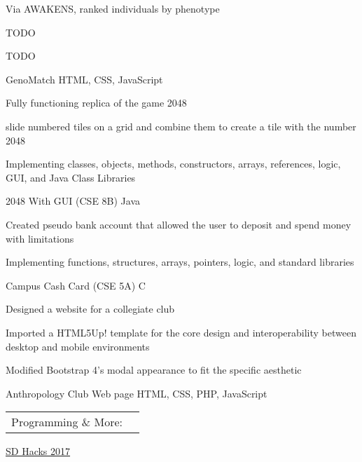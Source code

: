 \documentclass[]{awesome-cv}
\begin{document}
\begin{cventries}
	\cventry
	{\begin{cvitems}
	    \item Via AWAKENS, ranked individuals by phenotype
        \item TODO
        \item TODO
    \end{cvitems}}
	{GenoMatch}
	{HTML, CSS, JavaScript}
	{}
	{}
	
	\vspace{-5mm}
	\cventry
	{\begin{cvitems}
        \item Fully functioning replica of the game 2048
        \item slide numbered tiles on a grid and combine them to create a tile with the number 2048
        \item Implementing classes, objects, methods, constructors, arrays, references, logic, GUI, and Java Class Libraries
    \end{cvitems}}
	{2048 With GUI (CSE 8B)}
	{Java}
	{}
	{}

	\vspace{-5mm}
	\cventry
	{\begin{cvitems}
        \item Created pseudo bank account that allowed the user to deposit and spend money with limitations
        \item Implementing functions, structures, arrays, pointers, logic, and standard libraries
    \end{cvitems}}
	{Campus Cash Card (CSE 5A)}
	{C}
	{}
	{}

	\vspace{-5mm}
	\cventry
	{\begin{cvitems}
        \item Designed a website for a collegiate club
        \item Imported a HTML5Up! template for the core design and interoperability between desktop and mobile environments
        \item Modified Bootstrap 4’s modal appearance to fit the specific aesthetic
    \end{cvitems}}
	{Anthropology Club Web page}
	{HTML, CSS, PHP, JavaScript}
	{}
	{}

	\vspace{-5mm}
\end{cventries}
\begin{cventries}
	\cventry
	{}
	{\def\arraystretch{1.15}{\begin{tabular}{ l l }
		Programming \& More:  & {\skill{ Java, C, HTML, CSS, JavaScript, \LaTeX, MySQL, Git, Unix Shell, Ubuntu}} 
		\end{tabular}}}
	{}
	{}
	{}
\end{cventries}

\vspace{-7mm}
\begin{cvhonors}
	\cvhonor
	{\begin{cvitems}
	    \item \href{https://www.sdhacks.io/}{SD Hacks 2017}
	\end{cvitems}}
	{}
	{}
	{}
\end{cvhonors}
\ 
\end{document}
